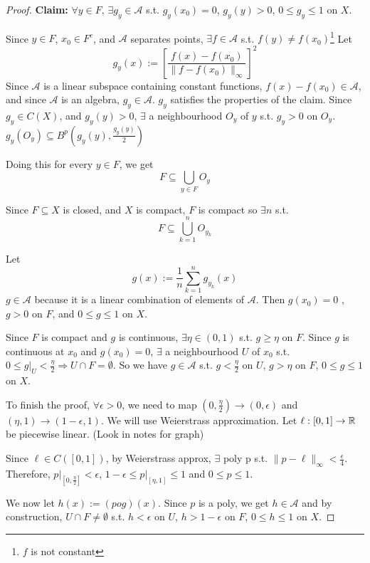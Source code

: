 \begin{proof} \leavevmode
    
    \noindent \textbf{Claim:} $\forall y \in F$, $\exists g_y \in \mathcal{A}$ s.t. $g_y(x_0) = 0$, $g_y(y) >0$, 
    $0 \leq g_y \leq 1$ on $X$.
    
    Since $y \in F$, $x_0 \in F^c$, and $\mathcal{A}$ separates points,
    $\exists f \in \mathcal{A}$ s.t. $f(y) \neq f(x_0)$\footnote{$f$ is not constant} 
    Let 
    \[
        g_y(x) := \left[\frac{f(x) - f(x_0)}{\| f - f(x_0) \|_{\infty} }\right]^2
    \] 
    Since $\mathcal{A}$ is a linear subspace containing constant functions, $f(x) - f(x_0) \in \mathcal{A}$,
    and since $\mathcal{A}$ is an algebra, $g_y \in \mathcal{A}$. $g_y$ satisfies the properties of the claim. 
    Since $g_y \in C(X)$, and $g_y(y) > 0$, $\exists $ a neighbourhood $O_y$ of $y$ s.t. 
    $g_y > 0$ on $O_y$. $g_y(O_y) \subseteq B^p(g_y(y), \frac{g_y(y)}{2})$      
    
    Doing this for every $y \in F$, we get \[F \subseteq \bigcup_{y \in F} O_y\]

    Since $F \subseteq X$ is closed, and $X$ is compact, $F$ is compact so $\exists n $ s.t. 
    \[
        F \subseteq \bigcup_{k=1}^{n} O_{y_k}
    \]     

    Let 
    \[
        g(x) := \frac{1}{n}\sum_{k=1}^{n} g_{y_k}(x)
    \]   
    $g \in \mathcal{A}$ because it is a linear combination of elements of $\mathcal{A}$.
    Then $g(x_0) = 0$ , $g > 0 $ on $F$, and $0 \leq g \leq 1$ on $X$.
    
    Since $F$ is compact and $g$ is continuous, $\exists \eta \in (0, 1)$ s.t. $g \geq \eta$ on $F$.
    Since $g$ is continuous at $x_0$ and $g(x_0) = 0$, $\exists$ a neighbourhood $U$ of $x_0$ s.t.
    $0 \leq g|_U < \frac{\eta}{2} \Rightarrow U \cap F = \emptyset$. So we have $g \in \mathcal{A}$ s.t.
    $g < \frac{\eta}{2}$ on $U$, $g > \eta$ on $F$, $0 \leq g \leq 1$ on $X$.
    
    To finish the proof, $\forall \epsilon > 0$, we need to map $(0, \frac{\eta}{2}) \to (0, \epsilon)$
    and $(\eta, 1) \to (1 - \epsilon, 1)$. We will use Weierstrass approximation.
    Let $\ell : [0, 1] \to \mathbb{R}$ be piecewise linear. (Look in notes for graph)

    Since $\ell \in C([0, 1])$, by Weierstrass approx, $\exists $ poly p s.t. $\| p - \ell \|_{\infty} <
    \frac{\epsilon}{4}$. Therefore, $ p|_{[0, \frac{\eta}{2}]} < \epsilon$, $1 - \epsilon \leq
    p|_{[\eta, 1]} \leq 1$ and $0 \leq p \leq 1$.
    
    We now let $h(x) := (p o g)(x)$. Since $p $ is a poly, we get $h \in \mathcal{A}$ and 
    by construction, $U \cap F \neq \emptyset$ s.t. $h < \epsilon$ on $U$, $h > 1 - \epsilon$ on $F$,
    $0 \leq h \leq 1$ on $X$. \qedhere        
\end{proof}


